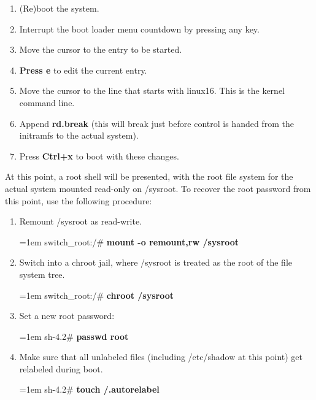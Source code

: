 \begin{flushleft}
	\begin{itemize}

		\begin{enumerate}
			\item (Re)boot the system.
			\item Interrupt the boot loader menu countdown by pressing any key.
			\item Move the cursor to the entry to be started.
			\item \textbf{Press e} to edit the current entry.
			\item Move the cursor to the line that starts with linux16. This is the kernel command line.
			\item Append \textbf{rd.break} (this will break just before control is handed from the initramfs to the actual system).
			\item Press \textbf{Ctrl+x} to boot with these changes.
		\end{enumerate}
		At this point, a root shell will be presented, with the root file system for the actual system 	mounted read-only on /sysroot.
		\newline
		\newline
		To recover the root password from this point, use the following procedure:
		
		\begin{enumerate}
			\item Remount /sysroot as read-write.
			\begin{tcolorbox}[breakable,notitle,boxrule=-0pt,colback=black,colframe=black]
				\color{green}
				\font=1em
				switch\_root:/\# \textbf{mount -o remount,rw /sysroot}
				\font=4pt
			\end{tcolorbox}
			\item Switch into a chroot jail, where /sysroot is treated as the root of the file system tree.
			\begin{tcolorbox}[breakable,notitle,boxrule=-0pt,colback=black,colframe=black]
				\color{green}
				\font=1em
				switch\_root:/\# \textbf{chroot /sysroot}
				\font=4pt
			\end{tcolorbox}
			\item Set a new root password:
			\begin{tcolorbox}[breakable,notitle,boxrule=-0pt,colback=black,colframe=black]
				\color{green}
				\font=1em
				sh-4.2\# \textbf{passwd root}
				\font=4pt
			\end{tcolorbox}
			\item Make sure that all unlabeled files (including /etc/shadow at this point) get relabeled during boot.
			\begin{tcolorbox}[breakable,notitle,boxrule=-0pt,colback=black,colframe=black]
				\color{green}
				\font=1em
				sh-4.2\# \textbf{touch /.autorelabel}
				\font=4pt
			\end{tcolorbox}
		

\end{enumerate}
\end{itemize}
\end{flushleft}

